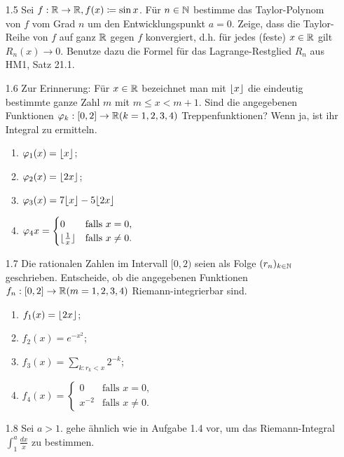 \documentclass{HM}
\begin{document}
	\begin{enumerate}
		\item[1.5] Sei $f:\mathbb{R}\to\mathbb{R}, f(x)\coloneqq\sin x$. Für $n\in\mathbb{N}$ bestimme das Taylor-Polynom von $f$ vom Grad $n$ um den Entwicklungspunkt $a=0$. Zeige, dass die Taylor-Reihe von $f$ auf ganz $\mathbb{R}$ gegen $f$ konvergiert, d.h. für jedes (feste) $x\in\mathbb{R}$ gilt $R_n(x)\to 0$. Benutze dazu die Formel für das Lagrange-Restglied $R_n$ aus HM1, Satz 21.1.
		
		\item[1.6] Zur Erinnerung: Für $x\in\mathbb{R}$ bezeichnet man mit $\lfloor x\rfloor$ die eindeutig bestimmte ganze Zahl $m$ mit $m\leq x < m+1$. Sind die angegebenen Funktionen $\varphi_k:[0,2]\to\mathbb{R}(k=1,2,3,4)$ Treppenfunktionen? Wenn ja, ist ihr Integral zu ermitteln.
		\begin{enumerate}
			\item $\varphi_1(x)=\lfloor x\rfloor$;
			\item $\varphi_2(x)=\lfloor2x\rfloor$;
			\item $\varphi_3(x)=7\lfloor x\rfloor-5\lfloor2x\rfloor$
			\item $\varphi_4{x}=\begin{cases}
				0&\text{falls }x=0,\\
				\lfloor\frac{1}{x}\rfloor&\text{falls }x\neq 0.			
			\end{cases}$
		\end{enumerate}
		
		\item[1.7] Die rationalen Zahlen im Intervall $[0,2)$ seien als Folge $(r_n)_{k\in\mathbb{N}}$ geschrieben. Entscheide, ob die angegebenen Funktionen $f_n:[0,2]\to\mathbb{R}(m=1,2,3,4)$ Riemann-integrierbar sind.
		\begin{enumerate}
			\item $f_1(x)=\lfloor2x\rfloor$;
			\item $f_2(x)=e^{-x^{2}}$;
			\item $f_3(x)=\sum\limits_{k:r_k<x}2^{-k}$;
			\item $f_4(x)=\begin{cases}
				0&\text{falls }x=0,\\
				x^{-2}&\text{falls }x\neq 0.			
			\end{cases}$
		\end{enumerate}
		
		\item[1.8] Sei $a>1$. gehe ähnlich wie in Aufgabe 1.4 vor, um das Riemann-Integral $\int_1^a\frac{dx}{x}$ zu bestimmen.
	\end{enumerate}
\end{document}
